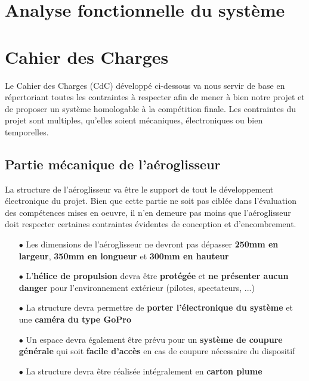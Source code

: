 \documentclass[a4paper,12pt]{report}
\begin{document}
	\section{Analyse fonctionnelle du système}
	
	
	
	\section{Cahier des Charges}
	
	\vspace{-1em}
	
	Le Cahier des Charges (CdC) développé ci-dessous va nous servir de base en répertoriant toutes les contraintes à respecter afin de mener à bien notre projet et de proposer un système homologable à la compétition finale. Les contraintes du projet sont multiples, qu'elles soient mécaniques, électroniques ou bien temporelles.
	
	\vspace{-1em}
	
		\subsection{Partie mécanique de l'aéroglisseur}
		
		\vspace{-1em}
		
		La structure de l'aéroglisseur va être le support de tout le développement électronique du projet. Bien que cette partie ne soit pas ciblée dans l'évaluation des compétences mises en oeuvre, il n'en demeure pas moins que l'aéroglisseur doit respecter certaines contraintes évidentes de conception et d'encombrement.
		
		\begin{itemize}
			\item[$\bullet$] Les dimensions de l'aéroglisseur ne devront pas dépasser \textbf{250mm en largeur}, \textbf{350mm en longueur} et \textbf{300mm en hauteur}
			\item[$\bullet$] L'\textbf{hélice de propulsion} devra être \textbf{protégée} et \textbf{ne présenter aucun danger} pour l'environnement extérieur (pilotes, spectateurs, ...)
			\item[$\bullet$] La structure devra permettre de \textbf{porter l'électronique du système} et une \textbf{caméra du type GoPro}
			\item[$\bullet$] Un espace devra également être prévu pour un \textbf{système de coupure générale} qui soit \textbf{facile d'accès} en cas de coupure nécessaire du dispositif
			\item[$\bullet$] La structure devra être réalisée intégralement en \textbf{carton plume}
		\end{itemize}
		
\end{document}
